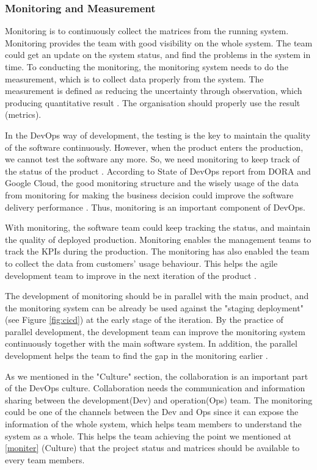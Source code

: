 \subsubsection[]{Monitoring and Measurement}
Monitoring is to continuously collect the matrices from the running system. Monitoring provides the team with good visibility on the whole system. The team could get an update on the system status, and find the problems in the system in time. To conducting the monitoring, the monitoring system needs to do the measurement, which is to collect data properly from the system. The measurement is defined as reducing the uncertainty through observation, which producing quantitative result \cite{hering2015measure}. The organisation should properly use the result (metrics).
\par
In the DevOps way of development, the testing is the key to maintain the quality of the software continuously. However, when the product enters the production, we cannot test the software any more. So, we need monitoring to keep track of the status of the product \cite{huttermann2012devops}. According to State of DevOps report from DORA and Google Cloud, the good monitoring structure and the wisely usage of the data from monitoring for making the business decision could improve the software delivery performance \cite{forsgrenaccelerate}. Thus, monitoring is an important component of DevOps.
\par
With monitoring, the software team could keep tracking the status, and maintain the quality of deployed production. Monitoring enables the management teams to track the KPIs during the production. The monitoring has also enabled the team to collect the data from customers' usage behaviour. This helps the agile development team to improve in the next iteration of the product \cite{lwakatare2015dimensions}.
\par
The development of monitoring should be in parallel with the main product, and the monitoring system can be already be used against the "staging deployment" (see Figure \ref{fig:cicd}) at the early stage of the iteration. By the practice of parallel development, the development team can improve the monitoring system continuously together with the main software system. In addition, the parallel development helps the team to find the gap in the monitoring earlier \cite{huttermann2012devops}.
\par
As we mentioned in the "Culture" section, the collaboration is an important part of the DevOps culture. Collaboration needs the communication and information sharing between the development(Dev) and operation(Ops) team. The monitoring could be one of the channels between the Dev and Ops since it can expose the information of the whole system, which helps team members to understand the system as a whole. This helps the team achieving the point we mentioned at \ref{moniter} (Culture) that the project status and matrices should be available to every team members.
